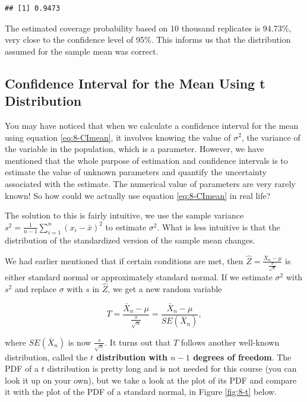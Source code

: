 \documentclass[
]{book}
\theoremstyle{definition}
\theoremstyle{definition}
\theoremstyle{definition}
\theoremstyle{definition}
\theoremstyle{remark}
\begin{document}
\begin{verbatim}
## [1] 0.9473
\end{verbatim}

The estimated coverage probability based on 10 thousand replicates is 94.73\%, very close to the confidence level of 95\%. This informs us that the distribution assumed for the sample mean was correct.

\hypertarget{CImeant}{%
\subsection{Confidence Interval for the Mean Using t Distribution}\label{CImeant}}

You may have noticed that when we calculate a confidence interval for the mean using equation \eqref{eq:8-CImean}, it involves knowing the value of \(\sigma^2\), the variance of the variable in the population, which is a parameter. However, we have mentioned that the whole purpose of estimation and confidence intervals is to estimate the value of unknown parameters and quantify the uncertainty associated with the estimate. The numerical value of parameters are very rarely known! So how could we actually use equation \eqref{eq:8-CImean} in real life?

The solution to this is fairly intuitive, we use the sample variance \(s^2 = \frac{1}{n-1} \sum_{i=1}^n (x_i - \bar{x})^2\) to estimate \(\sigma^2\). What is less intuitive is that the distribution of the standardized version of the sample mean changes.

We had earlier mentioned that if certain conditions are met, then \(\hat{Z} = \frac{\bar{X}_n - \mu}{\frac{\sigma}{\sqrt{n}}}\) is either standard normal or approximately standard normal. If we estimate \(\sigma^2\) with \(s^2\) and replace \(\sigma\) with \(s\) in \(\hat{Z}\), we get a new random variable

\begin{equation} 
T =  \frac{\bar{X}_n - \mu}{\frac{s}{\sqrt{n}}} = \frac{\bar{X}_n - \mu}{SE(\bar{X}_n)},
\label{eq:8-tstat}
\end{equation}

where \(SE(\bar{X}_n)\) is now \(\frac{s}{\sqrt{n}}\). It turns out that \(T\) follows another well-known distribution, called the \textbf{\(t\) distribution with \(n-1\) degrees of freedom}. The PDF of a \(t\) distribution is pretty long and is not needed for this course (you can look it up on your own), but we take a look at the plot of its PDF and compare it with the plot of the PDF of a standard normal, in Figure \ref{fig:8-t} below.
\end{document}
